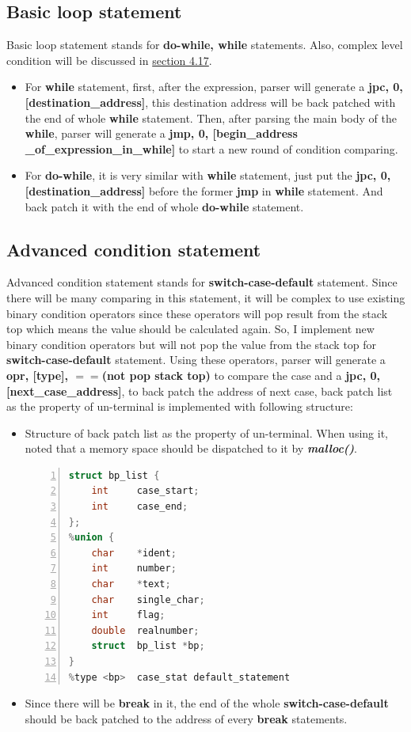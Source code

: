 \documentclass{article}
\begin{document}
		\subsection{Basic loop statement}
		Basic loop statement stands for \textbf{do-while, while} statements. Also, complex level condition will be discussed in \hyperlink{4.17}{section 4.17}. \\
		\begin{itemize}
		\item For \textbf{while} statement, first, after the expression, parser will generate a \textbf{jpc, 0, [destination\_address]}, this destination address will be back patched with the end of whole \textbf{while} statement. Then, after parsing the main body of the \textbf{while}, parser will generate a \textbf{jmp, 0, [begin\_address \_of\_expression\_in\_while]} to start a new round of condition comparing.
		\item For \textbf{do-while}, it is very similar with \textbf{while} statement, just put the \textbf{jpc, 0, [destination\_address]} before the former \textbf{jmp} in \textbf{while} statement. And back patch it with the end of whole \textbf{do-while} statement. 
		\end{itemize}
		\subsection{Advanced condition statement}
		Advanced condition statement stands for \textbf{switch-case-default} statement. Since there will be many comparing in this statement, it will be complex to use existing binary condition operators since these operators will pop result from the stack top which means the value should be calculated again. So, I implement new binary condition operators but will not pop the value from the stack top for \textbf{switch-case-default} statement. Using these operators, parser will generate a \textbf{opr, [type], $ == $(not pop stack top)} to compare the case and a \textbf{jpc, 0, [next\_case\_address]}, to back patch the address of next case, back patch list as the property of un-terminal is implemented with following structure:\\
		\begin{itemize}
		\item Structure of back patch list as the property of un-terminal. When using it, noted that a memory space should be dispatched to it by \textbf{\emph{malloc()}}.
		\begin{lstlisting}[language={C},numbers=left,numberstyle=\tiny,%frame=shadowbox,  
   rulesepcolor=\color{red!20!green!20!blue!20},  
   keywordstyle=\color{blue!70!black},  
   commentstyle=\color{blue!90!},  
   basicstyle=\ttfamily]  
struct bp_list {
	int 	case_start;
	int 	case_end;
};
%union {
	char 	*ident;
	int 	number;
	char 	*text;
	char 	single_char;
	int 	flag;
	double 	realnumber;
	struct 	bp_list *bp;
}
%type <bp>	case_stat default_statement	
		\end{lstlisting}
		\item Since there will be \textbf{break} in it, the end of the whole \textbf{switch-case-default} should be back patched to the address of every \textbf{break} statements.
		\end{itemize}
\end{document}
